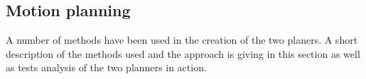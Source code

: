 \documentclass[../Head/Main.tex]{subfiles}
\begin{document}
\subsection{Motion planning}
A number of methods have been used in the creation of the two planers. A short description of the methods used and the approach is giving in this section as well as tests analysis of the two planners in action. 


\end{document}
